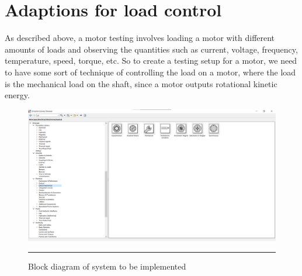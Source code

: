\section{Adaptions for load control}
As described above, a motor testing involves loading a motor with different amounts of loads and observing the quantities such as current, voltage, frequency, temperature, speed, torque, etc. So to create a testing setup for a motor, we need to have some sort of technique of controlling the load on a motor, where the load is the mechanical load on the shaft, since a motor outputs rotational kinetic energy. 
\begin{figure}[htbp]
	\centering
		\includegraphics[width = 4.5in]{./Figures/MS/fig32.png}
		\rule{35em}{0.5pt}
	\caption{Block diagram of system to be implemented}
	\label{fig:Block diagram of system to be implemented}
\end{figure}

